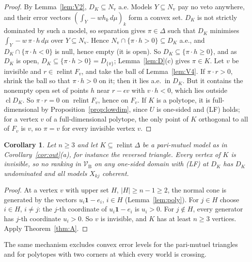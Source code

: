\documentclass[11pt]{article}
\newcommand{\one}{\mathbf{1}}
\newcommand{\VBB}{\mathcal{V}_{\mathrm B}}
\DeclareMathOperator{\relint}{relint}
\DeclareMathOperator{\cl}{cl}
\theoremstyle{plain}
\newtheorem{corollary}[theorem]{Corollary}
\theoremstyle{definition}
\theoremstyle{remark}
\begin{document}
\begin{proof}
By Lemma~\ref{lem:V2}, $D_K\subseteq N_{\mathrm v}$ a.e. Models $Y\subseteq N_{\mathrm v}$
pay no veto anywhere, and their error vectors $(\int_Y-wh_k\,d\mu)_k$ form a convex set.
$D_K$ is not strictly dominated by such a model, so separation gives $\pi\in\Delta$ such
that $D_K$ minimises $\int_Y-w\,\pi\cdot h\,d\mu$ over $Y\subseteq N_{\mathrm v}$. Hence
$N_{\mathrm v}\cap\{\pi\cdot h>0\}\subseteq D_K$ a.e., and $D_K\cap\{\pi\cdot h<0\}$ is null,
hence empty (it is open). So $D_K\subseteq\{\pi\cdot h\ge0\}$, and as $D_K$ is open,
$D_K\subseteq\{\pi\cdot h>0\}=D_{\{\pi\}}$; Lemma~\ref{lem:D}(c) gives $\pi\in K$. Let $v$ be invisible and $r\in\relint F_v$, and take the ball of
Lemma~\ref{lem:V4}. If $\pi\cdot r>0$, shrink the ball so that $\pi\cdot h>0$ on it; then it
lies a.e.\ in $D_K$. But it contains the nonempty open set of points $h$ near $r-\epsilon v$
with $v\cdot h<0$, which lies outside $\cl D_K$. So $\pi\cdot r=0$ on $\relint F_v$, hence on
$F_v$. If $K$ is a polytope, it is full-dimensional by Proposition~\ref{prop:lowdim}, since $U$ is
one-sided and (LF) holds; for a vertex $v$ of a full-dimensional polytope, the only point
of $K$ orthogonal to all of $F_v$ is $v$, so $\pi=v$ for every invisible vertex $v$.
\end{proof}

\begin{corollary}\label{cor:Apmm}
Let $n\ge3$ and let $K\subseteq\relint\Delta$ be a pari-mutuel model as in
Corollary~\ref{cor:out}(a), for instance the reversed triangle. Every vertex of $K$ is
invisible, so no ranking in $\VBB$ on any one-sided domain with (LF) at $D_K$ has $D_K$
undominated and all models $X_{kj}$ coherent.
\end{corollary}

\begin{proof}
At a vertex $v$ with upper set $H$, $|H|\ge n-1\ge2$, the normal cone is generated by the
vectors $u_i\one-e_i$, $i\in H$ (Lemma~\ref{lem:poly}). For $j\in H$ choose $i\in H$,
$i\ne j$: the $j$-th coordinate of $u_i\one-e_i$ is $u_i>0$. For $j\notin H$, every
generator has $j$-th coordinate $u_i>0$. So $v$ is invisible, and $K$ has at least $n\ge3$
vertices. Apply Theorem~\ref{thm:A}.
\end{proof}

The same mechanism excludes convex error levels for the pari-mutuel triangles and for
polytopes with two corners at which every world is crossing.
\end{document}
